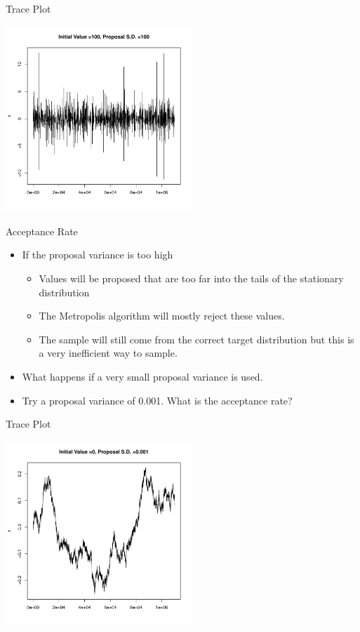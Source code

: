 \documentclass[10pt]{beamer}
\begin{document}
\begin{frame}{Trace Plot}
\begin{center}
\includegraphics[height=7cm]{./Pics/sp4.pdf}
\end{center}
\end{frame}
\begin{frame}{Acceptance Rate}
\begin{itemize}
\item If the proposal variance is too high

\begin{itemize}
\item Values will be proposed that are too far into the tails of the stationary distribution

\item The Metropolis algorithm will mostly reject these values.

\item The sample will still come from the  correct target distribution but this is a very inefficient way to sample.
\end{itemize}

\item What happens if a very small proposal variance is used.

\item Try a proposal variance of 0.001. What is the acceptance rate?
\end{itemize}
\end{frame}
\begin{frame}{Trace Plot}
\begin{center}
\includegraphics[height=7cm]{./Pics/sp5.pdf}
\end{center}
\end{frame}
\end{document}
